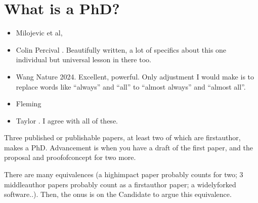 \documentclass[letterpaper,10pt,english]{sphinxmanual}
\begin{document}
\sphinxstepscope


\chapter{What is a PhD?}
\label{\detokenize{04WhatIsAPhD:what-is-a-phd}}\label{\detokenize{04WhatIsAPhD::doc}}\begin{itemize}
\item {} 
\sphinxAtStartPar
Milojevic et al, 

\item {} 
\sphinxAtStartPar
Colin Percival . Beautifully written, a lot of specifics about this one individual but universal lesson in there too.

\item {} 
\sphinxAtStartPar
Wang Nature  2024. Excellent, powerful. Only adjustment I would make is to replace words like “always” and “all” to “almost always” and “almost all”.

\item {} 
\sphinxAtStartPar
Fleming 

\item {} 
\sphinxAtStartPar
Taylor . I agree with all of these.

\end{itemize}

\sphinxAtStartPar
Three published or publishable papers, at least two of which are first\sphinxhyphen{}author, makes a PhD. Advancement is when you have a draft of the first paper, and the proposal and proof\sphinxhyphen{}of\sphinxhyphen{}concept for two more.

\sphinxAtStartPar
There are many equivalences (a high\sphinxhyphen{}impact paper probably counts for two; 3 middle\sphinxhyphen{}author papers probably count as a first\sphinxhyphen{}author paper; a widely\sphinxhyphen{}forked software..). Then, the onus is on the Candidate to argue this equivalence.
\end{document}
